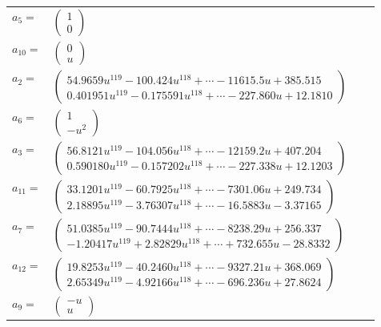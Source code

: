 \documentclass[1p]{elsarticle_modified}
\theoremstyle{definition}
\begin{document}
\begin{tabular}{m{7pt} m{180pt} m{7pt} m{180pt} }
\flushright $a_{5}=$&$\begin{pmatrix}1\\0\end{pmatrix}$ \\
\flushright $a_{10}=$&$\begin{pmatrix}0\\u\end{pmatrix}$ \\
\flushright $a_{2}=$&$\begin{pmatrix}54.9659 u^{119}-100.424 u^{118}+\cdots-11615.5 u+385.515\\0.401951 u^{119}-0.175591 u^{118}+\cdots-227.860 u+12.1810\end{pmatrix}$ \\
\flushright $a_{6}=$&$\begin{pmatrix}1\\- u^2\end{pmatrix}$ \\
\flushright $a_{3}=$&$\begin{pmatrix}56.8121 u^{119}-104.056 u^{118}+\cdots-12159.2 u+407.204\\0.590180 u^{119}-0.157202 u^{118}+\cdots-227.338 u+12.1203\end{pmatrix}$ \\
\flushright $a_{11}=$&$\begin{pmatrix}33.1201 u^{119}-60.7925 u^{118}+\cdots-7301.06 u+249.734\\2.18895 u^{119}-3.76307 u^{118}+\cdots-16.5883 u-3.37165\end{pmatrix}$ \\
\flushright $a_{7}=$&$\begin{pmatrix}51.0385 u^{119}-90.7444 u^{118}+\cdots-8238.29 u+256.337\\-1.20417 u^{119}+2.82829 u^{118}+\cdots+732.655 u-28.8332\end{pmatrix}$ \\
\flushright $a_{12}=$&$\begin{pmatrix}19.8253 u^{119}-40.2460 u^{118}+\cdots-9327.21 u+368.069\\2.65349 u^{119}-4.92166 u^{118}+\cdots-696.236 u+27.8624\end{pmatrix}$ \\
\flushright $a_{9}=$&$\begin{pmatrix}- u\\u\end{pmatrix}$ \\

\end{tabular}
\end{document}
